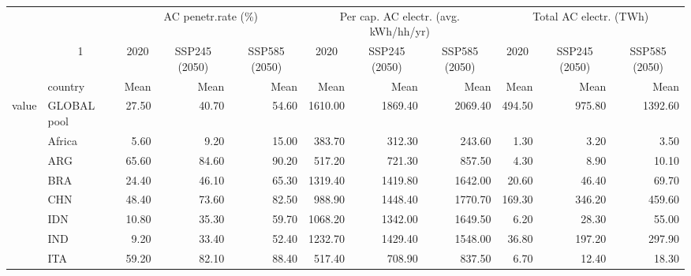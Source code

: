 \begin{table}
\centering
\begin{tabular}[t]{llrrrrrrrrr}
\toprule
\multicolumn{2}{c}{ } & \multicolumn{3}{c}{AC penetr.rate (\%)} & \multicolumn{3}{c}{Per cap. AC electr. (avg. kWh/hh/yr)} & \multicolumn{3}{c}{Total AC electr. (TWh)} \\
\cmidrule(l{3pt}r{3pt}){3-5} \cmidrule(l{3pt}r{3pt}){6-8} \cmidrule(l{3pt}r{3pt}){9-11}
\multicolumn{1}{c}{ } & \multicolumn{1}{c}{1} & \multicolumn{1}{c}{2020} & \multicolumn{1}{c}{SSP245 (2050)} & \multicolumn{1}{c}{SSP585 (2050)} & \multicolumn{1}{c}{2020} & \multicolumn{1}{c}{SSP245 (2050)} & \multicolumn{1}{c}{SSP585 (2050)} & \multicolumn{1}{c}{2020} & \multicolumn{1}{c}{SSP245 (2050)} & \multicolumn{1}{c}{SSP585 (2050)} \\
\cmidrule(l{3pt}r{3pt}){2-2} \cmidrule(l{3pt}r{3pt}){3-3} \cmidrule(l{3pt}r{3pt}){4-4} \cmidrule(l{3pt}r{3pt}){5-5} \cmidrule(l{3pt}r{3pt}){6-6} \cmidrule(l{3pt}r{3pt}){7-7} \cmidrule(l{3pt}r{3pt}){8-8} \cmidrule(l{3pt}r{3pt}){9-9} \cmidrule(l{3pt}r{3pt}){10-10} \cmidrule(l{3pt}r{3pt}){11-11}
  & country & Mean & Mean & Mean & Mean & Mean & Mean & Mean & Mean & Mean\\
\midrule
value & GLOBAL pool & \num{27.50} & \num{40.70} & \num{54.60} & \num{1610.00} & \num{1869.40} & \num{2069.40} & \num{494.50} & \num{975.80} & \num{1392.60}\\
 & Africa & \num{5.60} & \num{9.20} & \num{15.00} & \num{383.70} & \num{312.30} & \num{243.60} & \num{1.30} & \num{3.20} & \num{3.50}\\
 & ARG & \num{65.60} & \num{84.60} & \num{90.20} & \num{517.20} & \num{721.30} & \num{857.50} & \num{4.30} & \num{8.90} & \num{10.10}\\
 & BRA & \num{24.40} & \num{46.10} & \num{65.30} & \num{1319.40} & \num{1419.80} & \num{1642.00} & \num{20.60} & \num{46.40} & \num{69.70}\\
 & CHN & \num{48.40} & \num{73.60} & \num{82.50} & \num{988.90} & \num{1448.40} & \num{1770.70} & \num{169.30} & \num{346.20} & \num{459.60}\\
 & IDN & \num{10.80} & \num{35.30} & \num{59.70} & \num{1068.20} & \num{1342.00} & \num{1649.50} & \num{6.20} & \num{28.30} & \num{55.00}\\
 & IND & \num{9.20} & \num{33.40} & \num{52.40} & \num{1232.70} & \num{1429.40} & \num{1548.00} & \num{36.80} & \num{197.20} & \num{297.90}\\
 & ITA & \num{59.20} & \num{82.10} & \num{88.40} & \num{517.40} & \num{708.90} & \num{837.50} & \num{6.70} & \num{12.40} & \num{18.30}\\

\end{tabular}
\end{table}
